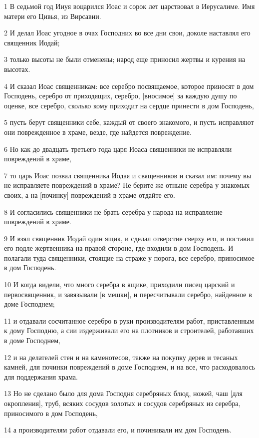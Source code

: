 \par 1 В седьмой год Ииуя воцарился Иоас и сорок лет царствовал в Иерусалиме. Имя матери его Цивья, из Вирсавии.
\par 2 И делал Иоас угодное в очах Господних во все дни свои, доколе наставлял его священник Иодай;
\par 3 только высоты не были отменены; народ еще приносил жертвы и курения на высотах.
\par 4 И сказал Иоас священникам: все серебро посвящаемое, которое приносят в дом Господень, серебро от приходящих, серебро, [вносимое] за каждую душу по оценке, все серебро, сколько кому приходит на сердце принести в дом Господень,
\par 5 пусть берут священники себе, каждый от своего знакомого, и пусть исправляют они поврежденное в храме, везде, где найдется повреждение.
\par 6 Но как до двадцать третьего года царя Иоаса священники не исправляли повреждений в храме,
\par 7 то царь Иоас позвал священника Иодая и священников и сказал им: почему вы не исправляете повреждений в храме? Не берите же отныне серебра у знакомых своих, а на [починку] повреждений в храме отдайте его.
\par 8 И согласились священники не брать серебра у народа на исправление повреждений в храме.
\par 9 И взял священник Иодай один ящик, и сделал отверстие сверху его, и поставил его подле жертвенника на правой стороне, где входили в дом Господень. И полагали туда священники, стоящие на страже у порога, все серебро, приносимое в дом Господень.
\par 10 И когда видели, что много серебра в ящике, приходили писец царский и первосвященник, и завязывали [в мешки], и пересчитывали серебро, найденное в доме Господнем;
\par 11 и отдавали сосчитанное серебро в руки производителям работ, приставленным к дому Господню, а сии издерживали его на плотников и строителей, работавших в доме Господнем,
\par 12 и на делателей стен и на каменотесов, также на покупку дерев и тесаных камней, для починки повреждений в доме Господнем, и на все, что расходовалось для поддержания храма.
\par 13 Но не сделано было для дома Господня серебряных блюд, ножей, чаш [для окропления], труб, всяких сосудов золотых и сосудов серебряных из серебра, приносимого в дом Господень,
\par 14 а производителям работ отдавали его, и починивали им дом Господень.
